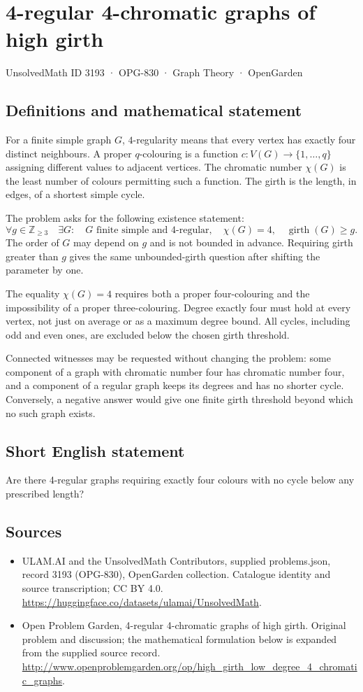 \documentclass[11pt,a4paper]{article}
\begin{document}
\section*{4-regular 4-chromatic graphs of high girth}\label{3193}
{\small UnsolvedMath ID 3193 · OPG-830 · Graph Theory · OpenGarden}
\subsection{Definitions and mathematical statement}
For a finite simple graph $G$, $4$-regularity means
that every vertex has exactly four distinct neighbours.
A proper $q$-colouring is a function
$c:V(G)\to\{1,\ldots,q\}$ assigning different values
to adjacent vertices. The chromatic number $\chi(G)$
is the least number of colours permitting such a
function. The girth is the length, in edges, of a
shortest simple cycle.

The problem asks for the following existence statement:
\[
 \forall g\in\mathbb Z_{\geq3}\quad\exists G:
 \quad G\text{ finite simple and $4$-regular},\quad
 \chi(G)=4,\quad\operatorname{girth}(G)\geq g.
\]
The order of $G$ may depend on $g$ and is not bounded
in advance. Requiring girth greater than $g$ gives
the same unbounded-girth question after shifting
the parameter by one.

The equality $\chi(G)=4$ requires both a proper
four-colouring and the impossibility of a proper
three-colouring. Degree exactly four must hold at
every vertex, not just on average or as a maximum
degree bound. All cycles, including odd and even
ones, are excluded below the chosen girth threshold.

Connected witnesses may be requested without changing
the problem: some component of a graph with chromatic
number four has chromatic number four, and a component
of a regular graph keeps its degrees and has no
shorter cycle. Conversely, a negative answer would
give one finite girth threshold beyond which no
such graph exists.
\subsection{Short English statement}
Are there 4-regular graphs requiring exactly four colours with no cycle below any prescribed length?
\subsection{Sources}
\begin{itemize}
\item[S1] ULAM.AI and the UnsolvedMath Contributors, supplied problems.json, record 3193 (OPG-830), OpenGarden collection. Catalogue identity and source transcription; CC BY 4.0.
\url{https://huggingface.co/datasets/ulamai/UnsolvedMath}.
\item[S2] Open Problem Garden, 4-regular 4-chromatic graphs of high girth. Original problem and discussion; the mathematical formulation below is expanded from the supplied source record.
\url{http://www.openproblemgarden.org/op/high_girth_low_degree_4_chromatic_graphs}.
\end{itemize}
\end{document}
